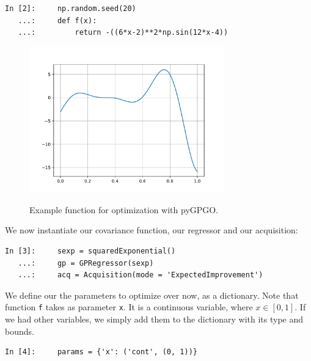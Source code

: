 \documentclass[10pt,a4paper,twoside]{book}
\begin{document}
\begin{verbatim}
In [2]:     np.random.seed(20)
   ...:     def f(x):
   ...:         return -((6*x-2)**2*np.sin(12*x-4))
\end{verbatim}

\begin{figure}
\centering
\caption{Example function for optimization with pyGPGO.}
\includegraphics[width=0.75\textwidth]{figures/chapter5/exfun}
\label{fig:exfun}
\end{figure}


We now instantiate our covariance function, our regressor and our acquisition:

\begin{verbatim}
In [3]:     sexp = squaredExponential()
   ...:     gp = GPRegressor(sexp)
   ...:     acq = Acquisition(mode = 'ExpectedImprovement')
\end{verbatim}

We define our the parameters to optimize over now, as a dictionary. Note that function \texttt{f} takes as parameter \texttt{x}. It is a continuous variable, where $x\in \left[0, 1\right]$. If we had other variables, we simply add them to the dictionary with its type and bounds.

\begin{verbatim}
In [4]:     params = {'x': ('cont', (0, 1))}
\end{verbatim}
\end{document}
